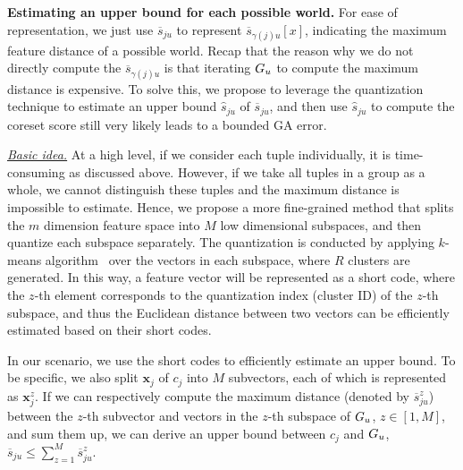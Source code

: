 \noindent \textbf{Estimating an upper bound for each possible world.} 
For ease of representation, we just use $\overline{s}_{ju}$ to represent  $\overline{s}_{\gamma(j)u}[x]$, indicating the maximum feature distance of a possible world.
%
%
 Recap that the reason why we do not directly compute the  $\overline{s}_{\gamma(j)u}$ is that iterating $G_u$ to compute the maximum distance is expensive.
To solve this, we propose to leverage the  quantization technique to estimate an upper bound $\hat{s}_{ju}$ of $\overline{s}_{ju}$, and then use $\hat{s}_{ju}$ to compute the coreset score still very likely leads to a bounded GA error.
  
\noindent  \underline{\textit{Basic idea.}} 
At a high level, if we consider each tuple individually, it is time-consuming as discussed above. However, if we take all tuples in a group as a whole, we cannot distinguish these tuples and the maximum distance is impossible to estimate. Hence, we propose a more fine-grained  method that  splits the $m$ dimension feature space into  $M$ low dimensional subspaces, and then quantize each subspace separately.  
The quantization is conducted by applying $k$-means algorithm~\cite{hartigan1979algorithm} over the vectors in each subspace, where $R$ clusters are generated.  
In this way, a feature vector will be represented as a short code, where the $z$-th element corresponds to the quantization index (\ie cluster ID) of the $z$-th subspace, and thus the Euclidean distance between two vectors can be efficiently estimated based on their short codes. 
  
  
  
  In our scenario, we use the short codes to efficiently estimate an upper bound.
  To be specific, we also split  $\mathbf{x}_{j}$ of $c_j$  into $M$ subvectors, each of which is represented  as $\mathbf{x}^z_{j}$. If we can respectively compute the maximum distance (denoted by $\overline{s}_{ju}^z$) between the $z$-th subvector and vectors in the $z$-th  subspace of $G_u$, $z\in [1,M]$, and sum them up, we can derive  an upper bound  between $c_j$ and $G_u$, \ie $ \overline{s}_{ju} \leq  \sum_{z = 1}^M  \overline{s}_{ju}^z$.

